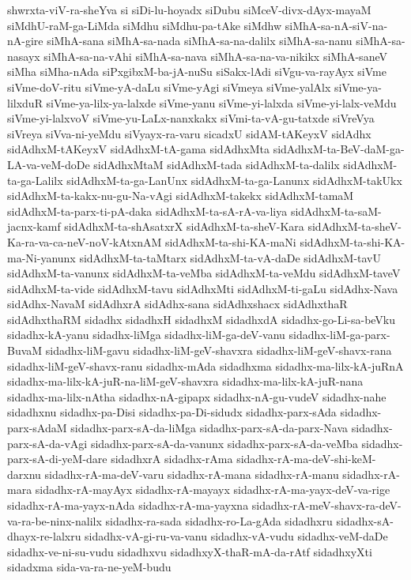 {shwrxta-viV-ra-sheYva
si
siDi-lu-hoyadx
siDubu
siMceV-divx-dAyx-mayaM
siMdhU-raM-ga-LiMda
siMdhu
siMdhu-pa-tAke
siMdhw
siMhA-sa-nA-siV-na-nA-gire
siMhA-sana
siMhA-sa-nada
siMhA-sa-na-dalilx
siMhA-sa-nanu
siMhA-sa-nasayx
siMhA-sa-na-vAhi
siMhA-sa-nava
siMhA-sa-na-va-nikikx
siMhA-saneV
siMha
siMha-nAda
siPxgibxM-ba-jA-nuSu
siSakx-lAdi
siVgu-va-rayAyx
siVme
siVme-doV-ritu
siVme-yA-daLu
siVme-yAgi
siVmeya
siVme-yalAlx
siVme-ya-lilxduR
siVme-ya-lilx-ya-lalxde
siVme-yanu
siVme-yi-lalxda
siVme-yi-lalx-veMdu
siVme-yi-lalxvoV
siVme-yu-LaLx-nanxkakx
siVmi-ta-vA-gu-tatxde
siVreVya
siVreya
siVva-ni-yeMdu
siVyayx-ra-varu
sicadxU
sidAM-tAKeyxV
sidAdhx
sidAdhxM-tAKeyxV
sidAdhxM-tA-gama
sidAdhxMta
sidAdhxM-ta-BeV-daM-ga-LA-va-veM-doDe
sidAdhxMtaM
sidAdhxM-tada
sidAdhxM-ta-dalilx
sidAdhxM-ta-ga-Lalilx
sidAdhxM-ta-ga-LanUnx
sidAdhxM-ta-ga-Lanunx
sidAdhxM-takUkx
sidAdhxM-ta-kakx-nu-gu-Na-vAgi
sidAdhxM-takekx
sidAdhxM-tamaM
sidAdhxM-ta-parx-ti-pA-daka
sidAdhxM-ta-sA-rA-va-liya
sidAdhxM-ta-saM-jacnx-kamf
sidAdhxM-ta-shAsatxrX
sidAdhxM-ta-sheV-Kara
sidAdhxM-ta-sheV-Ka-ra-va-ca-neV-noV-kAtxnAM
sidAdhxM-ta-shi-KA-maNi
sidAdhxM-ta-shi-KA-ma-Ni-yanunx
sidAdhxM-ta-taMtarx
sidAdhxM-ta-vA-daDe
sidAdhxM-tavU
sidAdhxM-ta-vanunx
sidAdhxM-ta-veMba
sidAdhxM-ta-veMdu
sidAdhxM-taveV
sidAdhxM-ta-vide
sidAdhxM-tavu
sidAdhxMti
sidAdhxM-ti-gaLu
sidAdhx-Nava
sidAdhx-NavaM
sidAdhxrA
sidAdhx-sana
sidAdhxshacx
sidAdhxthaR
sidAdhxthaRM
sidadhx
sidadhxH
sidadhxM
sidadhxdA
sidadhx-go-Li-sa-beVku
sidadhx-kA-yanu
sidadhx-liMga
sidadhx-liM-ga-deV-vanu
sidadhx-liM-ga-parx-BuvaM
sidadhx-liM-gavu
sidadhx-liM-geV-shavxra
sidadhx-liM-geV-shavx-rana
sidadhx-liM-geV-shavx-ranu
sidadhx-mAda
sidadhxma
sidadhx-ma-lilx-kA-juRnA
sidadhx-ma-lilx-kA-juR-na-liM-geV-shavxra
sidadhx-ma-lilx-kA-juR-nana
sidadhx-ma-lilx-nAtha
sidadhx-nA-gipapx
sidadhx-nA-gu-vudeV
sidadhx-nahe
sidadhxnu
sidadhx-pa-Disi
sidadhx-pa-Di-sidudx
sidadhx-parx-sAda
sidadhx-parx-sAdaM
sidadhx-parx-sA-da-liMga
sidadhx-parx-sA-da-parx-Nava
sidadhx-parx-sA-da-vAgi
sidadhx-parx-sA-da-vanunx
sidadhx-parx-sA-da-veMba
sidadhx-parx-sA-di-yeM-dare
sidadhxrA
sidadhx-rAma
sidadhx-rA-ma-deV-shi-keM-darxnu
sidadhx-rA-ma-deV-varu
sidadhx-rA-mana
sidadhx-rA-manu
sidadhx-rA-mara
sidadhx-rA-mayAyx
sidadhx-rA-mayayx
sidadhx-rA-ma-yayx-deV-va-rige
sidadhx-rA-ma-yayx-nAda
sidadhx-rA-ma-yayxna
sidadhx-rA-meV-shavx-ra-deV-va-ra-be-ninx-nalilx
sidadhx-ra-sada
sidadhx-ro-La-gAda
sidadhxru
sidadhx-sA-dhayx-re-lalxru
sidadhx-vA-gi-ru-va-vanu
sidadhx-vA-vudu
sidadhx-veM-daDe
sidadhx-ve-ni-su-vudu
sidadhxvu
sidadhxyX-thaR-mA-da-rAtf
sidadhxyXti
sidadxma
sida-va-ra-ne-yeM-budu
}
